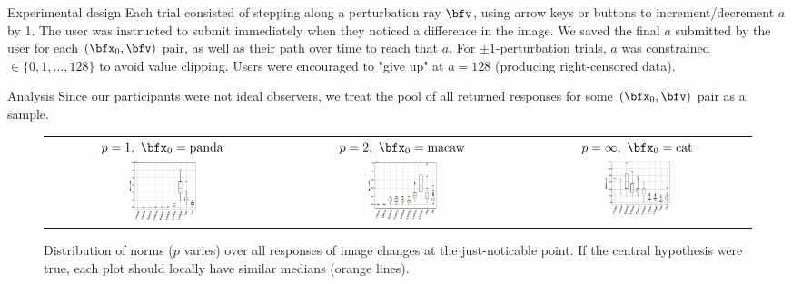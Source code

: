 \documentclass[final,notheorems]{beamer}
\newlength{\colwidth}
\begin{document}
\begin{frame}[t]
\begin{columns}[t]
\begin{column}{\colwidth}
\begin{block}{Experimental design}
    Each trial consisted of stepping along a perturbation ray $\bfv$, using arrow keys or buttons to increment/decrement $a$ by 1.
    The user was instructed to submit immediately when they noticed a difference in the image.
    We saved the final $a$ submitted by the user for each $(\bfx_0, \bfv)$ pair, as well as their path over time to reach that $a$.
    For $\pm1$-perturbation trials, $a$ was constrained $\in\{0,1,\ldots,128\}$ to avoid value clipping. Users were encouraged to "give up" at $a=128$ (producing right-censored data).

  \end{block}

  \begin{block}{Analysis}
    Since our participants were not ideal observers, we treat the pool of all returned responses for some $(\bfx_0, \bfv)$ pair as a sample.
\begin{figure}[h]
  \begin{center}
    \begin{tabular}{ccc}
      $p=1,\ \bfx_0=\text{panda}$ & $p=2,\ \bfx_0=\text{macaw}$ & $p=\infty,\ \bfx_0=\text{cat}$ \\
      \includegraphics[width=0.3\textwidth]{fig/pixel_1_norm_boxplot_panda.eps} &
      \includegraphics[width=0.3\textwidth]{fig/pixel_2_norm_boxplot_macaw.eps} &
      \includegraphics[width=0.3\textwidth]{fig/pixel_inf_norm_boxplot_cat.eps} 
    \end{tabular}
  \end{center}
  \caption{Distribution of norms ($p$ varies) over all responses of image changes at the just-noticable point. If the central hypothesis were true, each plot should locally have similar medians (orange lines).}
  \label{fig:Lp_excerpt}
\end{figure}



\end{block}
\end{column}
\end{columns}
\end{frame}
\end{document}
